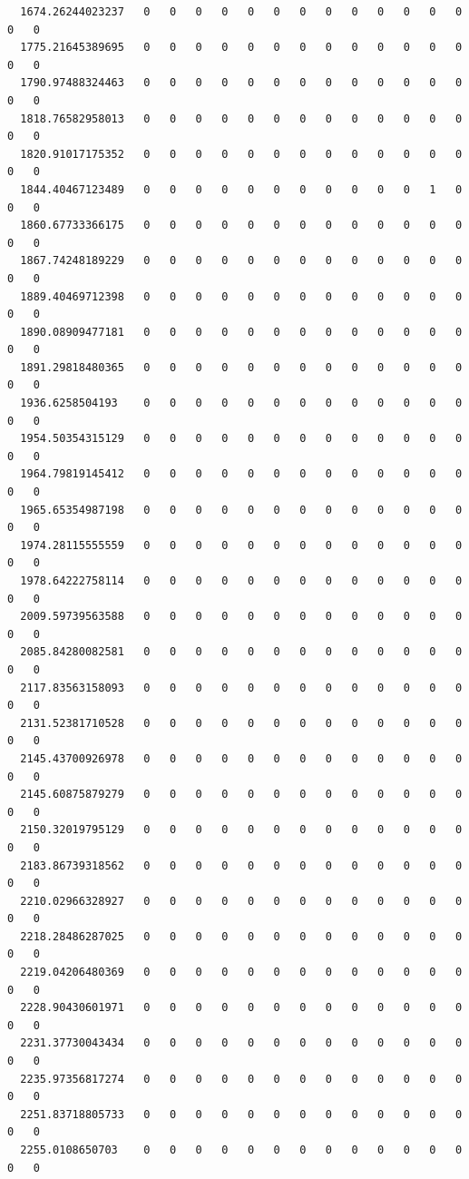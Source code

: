 \documentclass[
  letterpaper,
  DIV=11,
  numbers=noendperiod]{scrartcl}
\begin{document}
\begin{verbatim}
  1674.26244023237   0   0   0   0   0   0   0   0   0   0   0   0   0   0   0
  1775.21645389695   0   0   0   0   0   0   0   0   0   0   0   0   0   0   0
  1790.97488324463   0   0   0   0   0   0   0   0   0   0   0   0   0   0   0
  1818.76582958013   0   0   0   0   0   0   0   0   0   0   0   0   0   0   0
  1820.91017175352   0   0   0   0   0   0   0   0   0   0   0   0   0   0   0
  1844.40467123489   0   0   0   0   0   0   0   0   0   0   0   1   0   0   0
  1860.67733366175   0   0   0   0   0   0   0   0   0   0   0   0   0   0   0
  1867.74248189229   0   0   0   0   0   0   0   0   0   0   0   0   0   0   0
  1889.40469712398   0   0   0   0   0   0   0   0   0   0   0   0   0   0   0
  1890.08909477181   0   0   0   0   0   0   0   0   0   0   0   0   0   0   0
  1891.29818480365   0   0   0   0   0   0   0   0   0   0   0   0   0   0   0
  1936.6258504193    0   0   0   0   0   0   0   0   0   0   0   0   0   0   0
  1954.50354315129   0   0   0   0   0   0   0   0   0   0   0   0   0   0   0
  1964.79819145412   0   0   0   0   0   0   0   0   0   0   0   0   0   0   0
  1965.65354987198   0   0   0   0   0   0   0   0   0   0   0   0   0   0   0
  1974.28115555559   0   0   0   0   0   0   0   0   0   0   0   0   0   0   0
  1978.64222758114   0   0   0   0   0   0   0   0   0   0   0   0   0   0   0
  2009.59739563588   0   0   0   0   0   0   0   0   0   0   0   0   0   0   0
  2085.84280082581   0   0   0   0   0   0   0   0   0   0   0   0   0   0   0
  2117.83563158093   0   0   0   0   0   0   0   0   0   0   0   0   0   0   0
  2131.52381710528   0   0   0   0   0   0   0   0   0   0   0   0   0   0   0
  2145.43700926978   0   0   0   0   0   0   0   0   0   0   0   0   0   0   0
  2145.60875879279   0   0   0   0   0   0   0   0   0   0   0   0   0   0   0
  2150.32019795129   0   0   0   0   0   0   0   0   0   0   0   0   0   0   0
  2183.86739318562   0   0   0   0   0   0   0   0   0   0   0   0   0   0   0
  2210.02966328927   0   0   0   0   0   0   0   0   0   0   0   0   0   0   0
  2218.28486287025   0   0   0   0   0   0   0   0   0   0   0   0   0   0   0
  2219.04206480369   0   0   0   0   0   0   0   0   0   0   0   0   0   0   0
  2228.90430601971   0   0   0   0   0   0   0   0   0   0   0   0   0   0   0
  2231.37730043434   0   0   0   0   0   0   0   0   0   0   0   0   0   0   0
  2235.97356817274   0   0   0   0   0   0   0   0   0   0   0   0   0   0   0
  2251.83718805733   0   0   0   0   0   0   0   0   0   0   0   0   0   0   0
  2255.0108650703    0   0   0   0   0   0   0   0   0   0   0   0   0   0   0

\end{verbatim}
\end{document}
